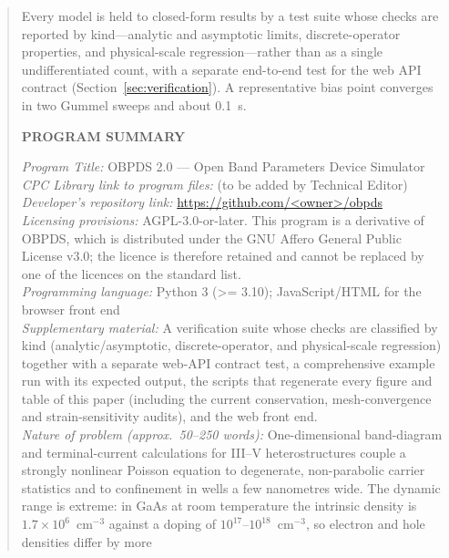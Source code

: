 \documentclass[preprint,12pt]{elsarticle}
\begin{document}
\begin{frontmatter}
\begin{abstract}
Every model is held to closed-form results by a test suite whose checks are
reported by kind---analytic and asymptotic limits, discrete-operator
properties, and physical-scale regression---rather than as a single
undifferentiated count, with a separate end-to-end test for the web API
contract (Section~\ref{sec:verification}). A representative bias point
converges in two Gummel sweeps and about \SI{0.1}{s}.

\vspace{1.2em}
\noindent \textbf{PROGRAM SUMMARY}

\begin{small}
\noindent
{\em Program Title:} OBPDS 2.0 --- Open Band Parameters Device Simulator \\
{\em CPC Library link to program files:} (to be added by Technical Editor) \\
{\em Developer's repository link:} \url{https://github.com/<owner>/obpds} \\
{\em Licensing provisions:} AGPL-3.0-or-later. This program is a derivative
of OBPDS, which is distributed under the GNU Affero General Public License
v3.0; the licence is therefore retained and cannot be replaced by one of the
licences on the standard list. \\
{\em Programming language:} Python 3 (>= 3.10); JavaScript/HTML for the
browser front end \\
{\em Supplementary material:} A verification suite whose checks are
classified by kind (analytic/asymptotic, discrete-operator, and
physical-scale regression) together with a separate web-API contract test,
a comprehensive example run with its expected output, the scripts that
regenerate every figure and table of this paper (including the current
conservation, mesh-convergence and strain-sensitivity audits), and the web
front end. \\
{\em Nature of problem (approx.\ 50--250 words):}
One-dimensional band-diagram and terminal-current calculations for III--V
heterostructures couple a strongly nonlinear Poisson equation to degenerate,
non-parabolic carrier statistics and to confinement in wells a few nanometres
wide. The dynamic range is extreme: in GaAs at room temperature the intrinsic
density is $1.7\times10^{6}$~cm$^{-3}$ against a doping of
$10^{17}$--$10^{18}$~cm$^{-3}$, so electron and hole densities differ by more

\end{small}
\end{abstract}
\end{frontmatter}
\end{document}
